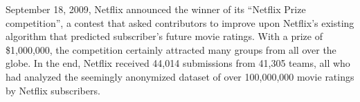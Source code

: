 \documentclass[10pt,journal,compsoc]{IEEEtran}
\begin{document}
%
\IEEEpeerreviewmaketitle







% 
% 
% 
% 
 September 18, 2009, Netflix announced the winner of its “Netflix Prize competition”, a contest that asked contributors to improve upon Netflix’s existing algorithm that predicted subscriber’s future movie ratings.  With a prize of \$1,000,000, the competition certainly attracted many groups from all over the globe.  In the end, Netflix received 44,014 submissions from 41,305 teams, all who had analyzed the seemingly anonymized dataset of over 100,000,000 movie ratings by Netflix subscribers.
\end{document}
